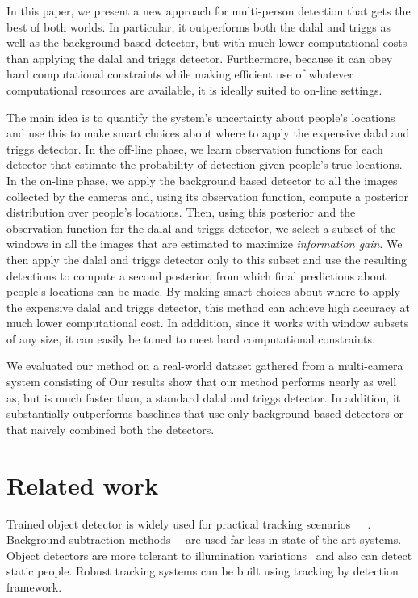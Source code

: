 \documentclass[10pt,twocolumn,letterpaper]{article}
\begin{document}
In this paper, we present a new approach for multi-person detection that gets the best of both worlds.  In particular, it outperforms both the dalal and triggs as well as the background based detector, but with much lower computational costs than applying the dalal and triggs detector.  Furthermore, because it can obey hard computational constraints while making efficient use of whatever computational resources are available, it is ideally suited to on-line settings.

The main idea is to quantify the system's uncertainty about people's locations and use this to make smart choices about where to apply the expensive dalal and triggs detector.  In the off-line phase, we learn observation functions for each detector that estimate the probability of detection given people's true locations.  In the on-line phase, we apply the background based detector to all the images collected by the cameras and, using its observation function, compute a posterior distribution over people's locations.  Then, using this posterior and the observation function for the dalal and triggs detector, we select a subset of the windows in all the images that are estimated to maximize \emph{information gain}.  We then apply the dalal and triggs detector only to this subset and use the resulting detections to compute a second posterior, from which final predictions about people's locations can be made.  By making smart choices about where to apply the expensive dalal and triggs detector, this method can achieve high accuracy at much lower computational cost.  In adddition, since it works with window subsets of any size, it can easily be tuned to meet hard computational constraints.  

We evaluated our method on a real-world dataset gathered from a multi-camera system consisting of   Our results show that our method performs nearly as well as, but is much faster than, a standard dalal and triggs detector.  In addition, it substantially outperforms baselines that use only background based detectors or that naively combined both the detectors.

\section {Related work} 

Trained object detector is widely used for practical tracking scenarios~\cite{Pami-11}~\cite{POM-main}~\cite{MIL-obj1}. Background subtraction methods~\cite{bk1}~\cite{bk2-bayesian} are used far less in state of the art systems. Object detectors are more tolerant to illumination variations~\cite{ObjDet-1} and also can detect static people. Robust tracking systems can be built using  tracking by detection framework.
\end{document}
